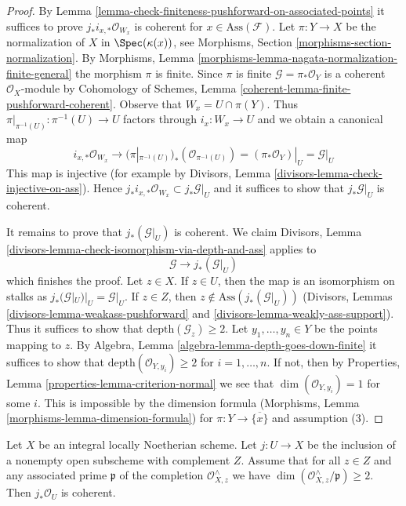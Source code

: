 \begin{proof}
By Lemma \ref{lemma-check-finiteness-pushforward-on-associated-points}
it suffices to prove $j_*i_{x, *}\mathcal{O}_{W_x}$ is coherent
for $x \in \text{Ass}(\mathcal{F})$.
Let $\pi : Y \to X$ be the normalization of $X$ in $\Spec(\kappa(x))$, see
Morphisms, Section \ref{morphisms-section-normalization}. By
Morphisms, Lemma \ref{morphisms-lemma-nagata-normalization-finite-general}
the morphism $\pi$ is finite. Since $\pi$ is finite
$\mathcal{G} = \pi_*\mathcal{O}_Y$ is a coherent $\mathcal{O}_X$-module by
Cohomology of Schemes, Lemma \ref{coherent-lemma-finite-pushforward-coherent}.
Observe that $W_x = U \cap \pi(Y)$. Thus
$\pi|_{\pi^{-1}(U)} : \pi^{-1}(U) \to U$ factors through $i_x : W_x \to U$
and we obtain a canonical map
$$
i_{x, *}\mathcal{O}_{W_x}
\longrightarrow
(\pi|_{\pi^{-1}(U)})_*(\mathcal{O}_{\pi^{-1}(U)}) =
(\pi_*\mathcal{O}_Y)|_U = \mathcal{G}|_U
$$
This map is injective (for example by Divisors, Lemma
\ref{divisors-lemma-check-injective-on-ass}). Hence
$j_*i_{x, *}\mathcal{O}_{W_x} \subset j_*\mathcal{G}|_U$
and it suffices to show that $j_*\mathcal{G}|_U$ is coherent.

\medskip\noindent
It remains to prove that $j_*(\mathcal{G}|_U)$ is coherent. We claim
Divisors, Lemma \ref{divisors-lemma-check-isomorphism-via-depth-and-ass}
applies to
$$
\mathcal{G} \longrightarrow j_*(\mathcal{G}|_U)
$$
which finishes the proof.
Let $z \in X$. If $z \in U$, then the map is an isomorphism
on stalks as $j_*(\mathcal{G}|_U)|_U = \mathcal{G}|_U$.
If $z \in Z$, then $z \not \in \text{Ass}(j_*(\mathcal{G}|_U))$
(Divisors, Lemmas \ref{divisors-lemma-weakass-pushforward} and
\ref{divisors-lemma-weakly-ass-support}).
Thus it suffices to show that $\text{depth}(\mathcal{G}_z) \geq 2$.
Let $y_1, \ldots, y_n \in Y$ be the points mapping to $z$.
By Algebra, Lemma \ref{algebra-lemma-depth-goes-down-finite}
it suffices to show that
$\text{depth}(\mathcal{O}_{Y, y_i}) \geq 2$ for $i = 1, \ldots, n$.
If not, then by Properties, Lemma \ref{properties-lemma-criterion-normal}
we see that $\dim(\mathcal{O}_{Y, y_i}) = 1$ for some $i$.
This is impossible by the dimension formula
(Morphisms, Lemma \ref{morphisms-lemma-dimension-formula})
for $\pi : Y \to \overline{\{x\}}$ and assumption (3).
\end{proof}

\begin{lemma}
\label{lemma-sharp-finiteness-pushforward}
Let $X$ be an integral locally Noetherian scheme. Let $j : U \to X$
be the inclusion of a nonempty open subscheme with complement $Z$. Assume
that for all $z \in Z$ and any associated prime $\mathfrak p$ of
the completion $\mathcal{O}_{X, z}^\wedge$
we have $\dim(\mathcal{O}_{X, z}^\wedge/\mathfrak p) \geq 2$.
Then $j_*\mathcal{O}_U$ is coherent.
\end{lemma}

